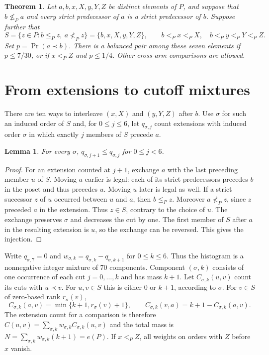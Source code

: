 \documentclass[11pt]{article}
\newtheorem{theorem}{Theorem}
\newtheorem{lemma}{Lemma}
\newcommand{\PrE}{\Pr}
\begin{document}
\begin{theorem}\label{thm:main}
Let $a,b,x,X,y,Y,Z$ be distinct elements of $P$, and suppose that
$b\not\le_P a$ and every strict predecessor of $a$ is a strict
predecessor of $b$. Suppose further that
\[
S=\{z\in P:b\le_P z,\ a\not<_P z\}
  =\{b,x,X,y,Y,Z\},\qquad
b<_P x<_P X,\quad b<_P y<_P Y<_P Z.
\]
Set $p=\PrE(a\prec b)$. There is a balanced pair among these seven
elements if $p\le7/30$, or if $x<_P Z$ and $p\le1/4$.
Other cross-arm comparisons are allowed.
\end{theorem}

\section{From extensions to cutoff mixtures}
There are ten ways to interleave $(x,X)$ and $(y,Y,Z)$ after $b$.
Use $\sigma$ for such an induced order of $S$ and, for $0\le j\le6$,
let $q_{\sigma,j}$ count extensions with induced order $\sigma$ in
which exactly $j$ members of $S$ precede $a$.

\begin{lemma}\label{lem:monotone}
For every $\sigma$, $q_{\sigma,j+1}\le q_{\sigma,j}$ for $0\le j<6$.
\end{lemma}
\begin{proof}
For an extension counted at $j+1$, exchange $a$ with the last preceding
member $u$ of $S$. Moving $a$ earlier is legal: each of its strict
predecessors precedes $b$ in the poset and thus precedes $u$.
Moving $u$ later is legal as well. If a strict successor $z$ of $u$
occurred between $u$ and $a$, then $b\le_P z$. Moreover $a\not<_P z$,
since $z$ preceded $a$ in the extension. Thus $z\in S$, contrary to
the choice of $u$. The exchange preserves $\sigma$ and decreases the
cut by one. The first member of $S$ after $a$ in the resulting extension
is $u$, so the exchange can be reversed. This gives the injection.
\end{proof}

Write $q_{\sigma,7}=0$ and $w_{\sigma,k}=q_{\sigma,k}-q_{\sigma,k+1}$
for $0\le k\le6$. Thus the histogram is a nonnegative integer mixture
of 70 components. Component $(\sigma,k)$ consists of one occurrence
of each cut $j=0,\dots,k$ and has mass $k+1$.
Let $C_{\sigma,k}(u,v)$ count its cuts with $u\prec v$. For $u,v\in S$
this is either $0$ or $k+1$, according to $\sigma$. For $v\in S$ of
zero-based rank $r_\sigma(v)$,
\[
 C_{\sigma,k}(a,v)=\min\{k+1,r_\sigma(v)+1\},
 \qquad C_{\sigma,k}(v,a)=k+1-C_{\sigma,k}(a,v).
\]
The extension count for a comparison is therefore
$C(u,v)=\sum_{\sigma,k}w_{\sigma,k}C_{\sigma,k}(u,v)$ and the total
mass is $N=\sum_{\sigma,k}w_{\sigma,k}(k+1)=e(P)$.
If $x<_P Z$, all weights on orders with $Z$ before $x$ vanish.
\end{document}
